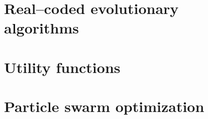 \section{Real--coded evolutionary algorithms}




\section{Utility functions}




\section{Particle swarm optimization}

